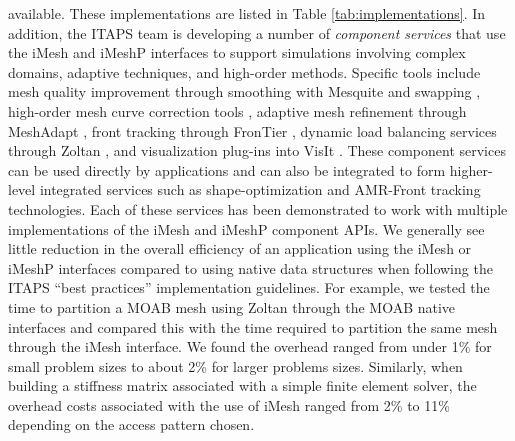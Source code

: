 \documentclass[letterpaper]{jpconf}
\begin{document}
available.  These implementations are listed in Table
\ref{tab:implementations}.  In addition, the ITAPS team is developing
a number of {\it component services} that use the iMesh and iMeshP
interfaces to support simulations involving complex domains, adaptive
techniques, and high-order methods.  Specific tools include mesh
quality improvement through smoothing with Mesquite
\cite{mesquite_download} and swapping \cite{frei-cfog:ijnme97},
high-order mesh curve correction tools \cite{Luo04}, adaptive mesh
refinement through MeshAdapt \cite{LiSh05}, front tracking through
FronTier \cite{BoFi07}, dynamic load balancing services through Zoltan
\cite{devi02}, and visualization plug-ins into VisIt
\cite{Childs:2005:ACS}. These component services can be used directly
by applications and can also be integrated to form higher-level
integrated services such as shape-optimization and AMR-Front tracking
technologies.  Each of these services has been demonstrated to work
with multiple implementations of the iMesh and iMeshP component APIs.
We generally see little reduction in the overall efficiency of an
application using the iMesh or iMeshP interfaces compared to using
native data structures when following the ITAPS ``best practices''
implementation guidelines.  For example, we tested the time to
partition a MOAB mesh using Zoltan through the MOAB native interfaces
and compared this with the time required to partition the same mesh
through the iMesh interface.  We found the overhead ranged from under
1\% for small problem sizes to about 2\% for larger problems sizes.
Similarly, when building a stiffness matrix associated with a simple
finite element solver, the overhead costs associated with the use of
iMesh ranged from 2\% to 11\% depending on the access pattern chosen.
\end{document}
